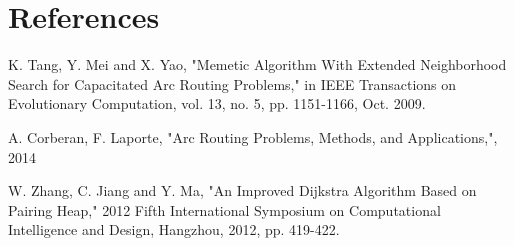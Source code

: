 \documentclass[9pt,shortpaper,twoside,web]{ieeecolor}
\begin{document}
\bigskip
\section{References}
\bigskip
\noindent
[1] K. Tang, Y. Mei and X. Yao, "Memetic Algorithm With Extended Neighborhood Search for Capacitated Arc Routing Problems," in IEEE Transactions on Evolutionary Computation, vol. 13, no. 5, pp. 1151-1166, Oct. 2009.

\noindent
[2] A. Corberan, F. Laporte, "Arc Routing Problems, Methods, and Applications,", 2014

\noindent
[3] W. Zhang, C. Jiang and Y. Ma, "An Improved Dijkstra Algorithm Based on Pairing Heap," 2012 Fifth International Symposium on Computational Intelligence and Design, Hangzhou, 2012, pp. 419-422.
\end{document}
